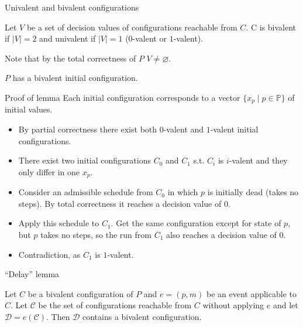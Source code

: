 \documentclass{beamer}
\begin{document}
\begin{frame}{Univalent and bivalent configurations}
  \begin{definition}
    Let $V$ be a set of decision values of configurations reachable from $C$. C is \alert{bivalent} if $|V| = 2$ and \alert{univalent} if $|V| = 1$ ($0$-valent or $1$-valent).
    
    Note that by the total correctness of $P$ $V \ne \varnothing$.
  \end{definition}
  \begin{lemma}
    $P$ has a bivalent initial configuration.
  \end{lemma}
\end{frame}

\begin{frame}{Proof of lemma}
Each initial configuration corresponds to a vector $\{ x_p \mid p \in \mathbb{P} \}$ of initial values.
  \begin{itemize}
    \item By partial correctness there exist both $0$-valent and $1$-valent initial configurations.
    \item There exist two initial configurations $C_0$ and $C_1$ s.t. $C_i$ is $i$-valent and they only differ in one $x_p$.
    \item Consider an admissible schedule from $C_0$ in which $p$ is initially dead (takes no steps). By total correctness it reaches a decision value of $0$.
    \item Apply this schedule to $C_1$. Get the same configuration except for state of $p$, but $p$ takes no steps, so the run from $C_1$ also reaches a decision value of $0$.
    \item Contradiction, as $C_1$ is $1$-valent.
  \end{itemize}
\end{frame}

\begin{frame}{``Delay'' lemma}
  \begin{lemma}
    Let $C$ be a bivalent configuration of $P$ and $e=(p,m)$ be an event applicable to $C$. Let $\mathcal{C}$ be the set of configurations reachable from $C$ without applying $e$ and let $\mathcal{D} = e(\mathcal{C})$. Then $\mathcal{D}$ contains a bivalent configuration.
  \end{lemma}
\end{frame}
\end{document}
